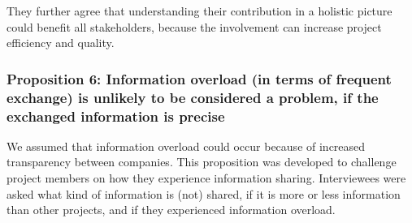 They further agree that understanding their contribution in a holistic picture could benefit all stakeholders, because the involvement can increase project efficiency and quality.




\subsubsection{Proposition 6: Information overload (in terms of frequent exchange) is unlikely to be considered a problem, if the exchanged information is precise}


We assumed that information overload could occur because of increased transparency between companies. This proposition was developed to challenge project members on how they experience information sharing. 
Interviewees were asked what kind of information is (not) shared, if it is %
more or less information than other projects, and if they experienced information overload. 



%


